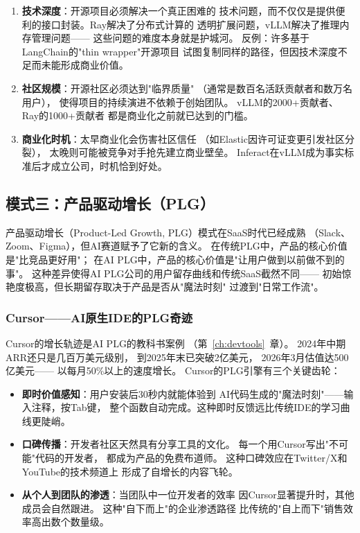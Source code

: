 \begin{warnbox}[开源→商业的三个必要条件]
\begin{enumerate}
  \item \textbf{技术深度}：开源项目必须解决一个真正困难的
    技术问题，而不仅仅是提供便利的接口封装。Ray解决了分布式计算的
    透明扩展问题，vLLM解决了推理内存管理问题——
    这些问题的难度本身就是护城河。
    反例：许多基于LangChain的"thin wrapper"开源项目
    试图复制同样的路径，但因技术深度不足而未能形成商业价值。
  \item \textbf{社区规模}：开源社区必须达到"临界质量"
    （通常是数百名活跃贡献者和数万名用户），
    使得项目的持续演进不依赖于创始团队。
    vLLM的2000+贡献者、Ray的1000+贡献者
    都是商业化之前就已达到的门槛。
  \item \textbf{商业化时机}：太早商业化会伤害社区信任
    （如Elastic因许可证变更引发社区分裂），
    太晚则可能被竞争对手抢先建立商业壁垒。
    Inferact在vLLM成为事实标准后才成立公司，时机恰到好处。
\end{enumerate}
\end{warnbox}


\subsection{模式三：产品驱动增长（PLG）}

产品驱动增长（Product-Led Growth, PLG）模式在SaaS时代已经成熟
（Slack、Zoom、Figma），但AI赛道赋予了它新的含义。
在传统PLG中，产品的核心价值是"比竞品更好用"；
在AI PLG中，产品的核心价值是"让用户做到以前做不到的事"。
这种差异使得AI PLG公司的用户留存曲线和传统SaaS截然不同——
初始惊艳度极高，但长期留存取决于产品是否从"魔法时刻"
过渡到"日常工作流"。

\subsubsection{Cursor——AI原生IDE的PLG奇迹}
Cursor的增长轨迹是AI PLG的教科书案例
（第~\ref{ch:devtools}~章）。
2024年中期ARR还只是几百万美元级别，
到2025年末已突破2亿美元，
2026年3月估值达500亿美元——
以每月50\%以上的速度增长。
Cursor的PLG引擎有三个关键齿轮：
\begin{itemize}
  \item \textbf{即时价值感知}：用户安装后30秒内就能体验到
    AI代码生成的"魔法时刻"——输入注释，按Tab键，
    整个函数自动完成。这种即时反馈远比传统IDE的学习曲线更陡峭。
  \item \textbf{口碑传播}：开发者社区天然具有分享工具的文化。
    每一个用Cursor写出"不可能"代码的开发者，
    都成为产品的免费布道师。
    这种口碑效应在Twitter/X和YouTube的技术频道上
    形成了自增长的内容飞轮。
  \item \textbf{从个人到团队的渗透}：当团队中一位开发者的效率
    因Cursor显著提升时，其他成员会自然跟进。
    这种"自下而上"的企业渗透路径
    比传统的"自上而下"销售效率高出数个数量级。
\end{itemize}

